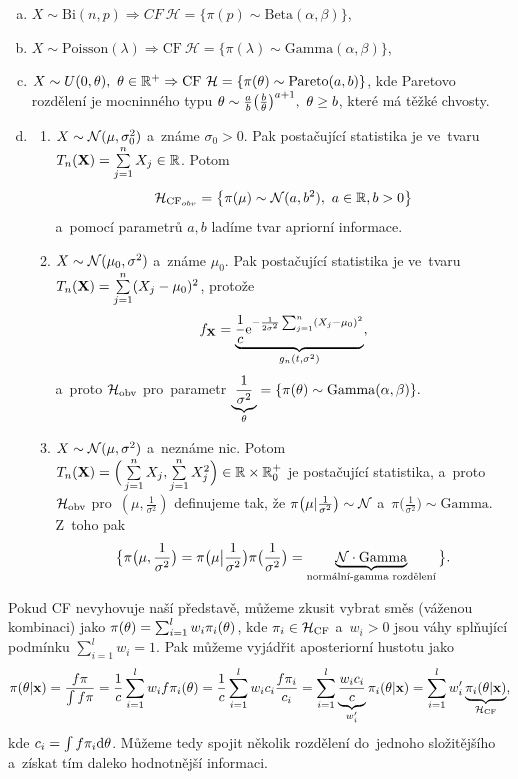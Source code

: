 \begin{example}[Příklady CF]
	\begin{enumerate}[a)]
		\item $X\sim \mathrm{Bi}(n,p)\Rightarrow CF~\mathcal{H}=\{\pi(p)\sim\mathrm{Beta}(\alpha,\beta)\}$,
		\item $X\sim\mathrm{Poisson}(\lambda)\Rightarrow \mathrm{CF}~\mathcal{H}=\{\pi(\lambda)\sim\mathrm{Gamma}(\alpha,\beta)\}$,
		\item $X\sim U(0,\theta),~\theta\in\mathbb{R}^+\Rightarrow \mathrm{CF}~\mathcal{H}=\{\pi(\theta)\sim\mathrm{Pareto}(a,b)\}$, kde Paretovo rozdělení je mocninného typu $\theta\sim\frac{a}{b}\big(\frac{b}{\theta}\big)^{a+1},~\theta\geq b$, které má těžké chvosty.
		\item \begin{enumerate}[1)]
			\item $X\sim \mathcal{N}(\mu,\sigma_0^2)$ a~známe $\sigma_0>0$. Pak postačující statistika je ve~tvaru $T_n(\textbf{X})=\sum\limits_{j=1}^{n} X_j\in\mathbb{R}$. Potom $$\mathcal{H}_{\mathrm{CF}_{obv}}=\big\{\pi(\mu)\sim\mathcal{N}(a,b^2),~a\in\mathbb{R},b>0\big\}$$ a~pomocí parametrů $a,b$ ladíme tvar apriorní informace.
			\item $X\sim\mathcal{N}(\mu_0,\sigma^2)$ a~známe $\mu_0$. Pak postačující statistika je ve~tvaru $T_n(\textbf{X})=\sum\limits_{j=1}^{n}(X_j-\mu_0)^2$, protože 
			$$ f_{\textbf{X}}=\underbrace{\frac{1}{c}\mathrm{e}^{-\frac{1}{2\sigma^2}\sum_{j=1}^n(X_j-\mu_0)^2}}_{g_n(t,\sigma^2)},$$ a~proto $\mathcal{H}_\text{obv}$ pro~parametr $\underbrace{\frac{1}{\sigma^2}}_{\theta}=\{\pi(\theta)\sim\mathrm{Gamma}(\alpha,\beta)\}.$
			\item $X\sim\mathcal{N}(\mu,\sigma^2)$ a~neznáme nic. Potom $T_n(\textbf{X})=\Big(\sum\limits_{j=1}^{n} X_j,\sum\limits_{j=1}^{n} X_j^2\Big)\in\mathbb{R}\times\mathbb{R}_0^+$ je postačující statistika, a~proto
			$\mathcal{H}_\text{obv}$ pro~$(\mu,\frac{1}{\sigma^2})$ definujeme tak, že $\pi\big(\mu|\frac{
				1}{\sigma^2}\big)\sim\mathcal{N}$ a~$\pi\big(\frac{1}{\sigma^2}\big)\sim\mathrm{Gamma}$. Z~toho pak 
			$$\big\{ \pi\big(\mu,\frac{1}{\sigma^2}\big)=\pi\big(\mu\big|\frac{1}{\sigma^2}\big)\pi\big(\frac{1}{\sigma^2}\big)=\underbrace{\mathcal{N}\cdot\mathrm{Gamma}}_{\text{normální-gamma rozdělení}}\big\}.$$
		\end{enumerate}
	\end{enumerate}
\end{example}
\begin{remark}[Směs z~CF] Pokud CF nevyhovuje naší představě, můžeme zkusit vybrat směs (váženou kombinaci) jako
	$\pi(\theta)=\sum_{i=1}^lw_i\pi_i(\theta)$, kde $\pi_i\in\mathcal{H}_\mathrm{CF}$ a~$w_i>0$ jsou váhy splňující podmínku $\sum_{i=1}^l w_i=1$. Pak můžeme vyjádřit aposteriorní hustotu jako $$\pi(\theta|\textbf{x})=\frac{f\pi}{\int f\pi}=\frac{1}{c}\sum_{i=1}^lw_i f\pi_i(\theta)=\frac{1}{c}\sum_{i=1}^l w_ic_i\frac{f \pi_i}{c_i}=\sum_{i=1}^l \underbrace{\frac{w_ic_i}{c}}_{w_i'}\pi_i(\theta|\textbf{x})=\sum_{i=1}^l w_i'\underbrace{\pi_i(\theta|\textbf{x})}_{\mathcal{H}_\mathrm{CF}},$$
	kde $c_i=\int f\pi_i\mathrm{d}\theta$. Můžeme tedy spojit několik rozdělení do~jednoho složitějšího a~získat tím daleko hodnotnější informaci.
\end{remark}

